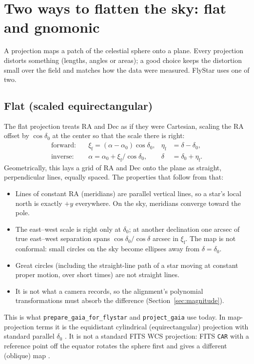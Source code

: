\documentclass[11pt]{article}
\newcommand{\code}[1]{\texttt{#1}}
\begin{document}
\section{Two ways to flatten the sky: flat and gnomonic}
\label{sec:projections}

A projection maps a patch of the celestial sphere onto a plane. Every
projection distorts something (lengths, angles or areas); a good choice keeps
the distortion small over the field and matches how the data were measured.
FlyStar uses one of two.

\subsection{Flat (scaled equirectangular)}

The flat projection treats RA and Dec as if they were Cartesian, scaling the RA
offset by $\cos\delta_0$ at the center so that the scale there is right:
\begin{align}
  \text{forward:}\quad &\xi_\mathrm{f} = (\alpha-\alpha_0)\cos\delta_0, & \eta_\mathrm{f} &= \delta-\delta_0, \label{eq:flat}\\
  \text{inverse:}\quad &\alpha = \alpha_0 + \xi_\mathrm{f}/\cos\delta_0, & \delta &= \delta_0 + \eta_\mathrm{f}. \label{eq:flatinv}
\end{align}
Geometrically, this lays a grid of RA and Dec onto the plane as straight,
perpendicular lines, equally spaced. The properties that follow from that:
\begin{itemize}
  \item Lines of constant RA (meridians) are parallel vertical lines, so a
    star's local north is exactly $+y$ everywhere. On the sky, meridians
    converge toward the pole.
  \item The east--west scale is right only at $\delta_0$; at another declination
    one arcsec of true east--west separation spans $\cos\delta_0/\cos\delta$
    arcsec in $\xi_\mathrm{f}$. The map is not conformal: small circles on the
    sky become ellipses away from $\delta=\delta_0$.
  \item Great circles (including the straight-line path of a star moving at
    constant proper motion, over short times) are not straight lines.
  \item It is not what a camera records, so the alignment's polynomial
    transformations must absorb the difference (Section~\ref{sec:magnitude}).
\end{itemize}
This is what \code{prepare\_gaia\_for\_flystar} and \code{project\_gaia}
use today. In map-projection terms it is the equidistant cylindrical
(equirectangular) projection with standard parallel $\delta_0$
\citep[][Sect.~12]{Snyder1987}. It is not a standard FITS WCS projection: FITS
\code{CAR} with a reference point off the equator rotates the sphere first and
gives a different (oblique) map \citep{Calabretta2002}.
\end{document}
